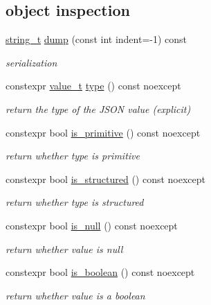 \subsection*{object inspection}
\begin{DoxyCompactItemize}
\item 
\hyperlink{classnlohmann_1_1basic__json_ab63e618bbb0371042b1bec17f5891f42}{string\-\_\-t} \hyperlink{classnlohmann_1_1basic__json_a805e3f3a2f374da0e14942eec7400e40}{dump} (const int indent=-\/1) const 
\begin{DoxyCompactList}\small\item\em serialization \end{DoxyCompactList}\item 
constexpr \hyperlink{classnlohmann_1_1basic__json_a231b02148577b69a154b2ce2c87a5522}{value\-\_\-t} \hyperlink{classnlohmann_1_1basic__json_a5d466b240d0ba9f648d7fd4ff42359f5}{type} () const noexcept
\begin{DoxyCompactList}\small\item\em return the type of the J\-S\-O\-N value (explicit) \end{DoxyCompactList}\item 
constexpr bool \hyperlink{classnlohmann_1_1basic__json_adcd6086bac286854d5cc8b7f84d74a49}{is\-\_\-primitive} () const noexcept
\begin{DoxyCompactList}\small\item\em return whether type is primitive \end{DoxyCompactList}\item 
constexpr bool \hyperlink{classnlohmann_1_1basic__json_a873f4bff2f2a83f68fc1b5341ebdd446}{is\-\_\-structured} () const noexcept
\begin{DoxyCompactList}\small\item\em return whether type is structured \end{DoxyCompactList}\item 
constexpr bool \hyperlink{classnlohmann_1_1basic__json_a8abdfc0d6e051f6fa29d49da57bce631}{is\-\_\-null} () const noexcept
\begin{DoxyCompactList}\small\item\em return whether value is null \end{DoxyCompactList}\item 
constexpr bool \hyperlink{classnlohmann_1_1basic__json_adade77415e7f7bf08a9b5150c742714d}{is\-\_\-boolean} () const noexcept
\begin{DoxyCompactList}\small\item\em return whether value is a boolean \end{DoxyCompactList}\item 

\end{DoxyCompactItemize}

